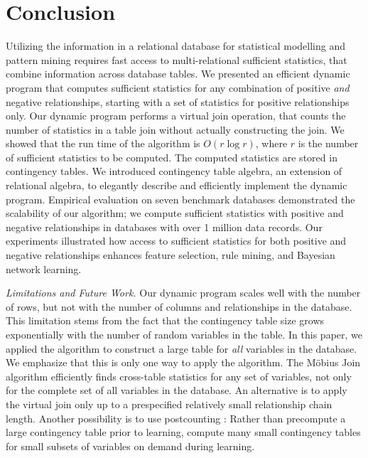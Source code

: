 \documentclass{sig-alternate-2013}
\begin{document}
\section{Conclusion} \label{sec:conclusion} 
Utilizing the information in a relational database for statistical modelling and pattern mining requires fast access to multi-relational sufficient statistics, that combine information across database tables. 
We presented an efficient dynamic program that computes sufficient statistics for any combination of positive {\em and} negative relationships, starting with a set of statistics for positive relationships only.
Our dynamic program performs a virtual join operation, that counts the number of statistics in a table join without actually constructing the join. We showed that the run time of the algorithm is $O(r \log r)$, where $r$ is the number of sufficient statistics to be computed.
The computed statistics are stored in contingency tables.
We introduced contingency table algebra, an extension of relational algebra, to elegantly describe and efficiently implement the dynamic program. 
Empirical evaluation on seven benchmark databases demonstrated the scalability of our algorithm; we compute sufficient statistics with positive and negative relationships in databases with over 1 million data records.  
Our experiments illustrated how access to sufficient statistics for both positive and negative relationships enhances feature selection, rule mining, and Bayesian network learning.  




\emph{Limitations and Future Work.} 
Our dynamic program scales well with the number of rows, but not with the number of columns and relationships in the database. 
This limitation stems from the fact that the contingency table size grows exponentially with the number of random variables in the table. In this paper, we applied the algorithm to construct a large table for {\em all} variables in the database. We emphasize that this is only one way to apply the algorithm. The M\"obius Join algorithm efficiently finds cross-table statistics for any set of variables, not only for the complete set of all variables in the database. An alternative is to apply the virtual join only up to a prespecified relatively small relationship chain length.
Another possibility is to use postcounting \cite{lv2012}: Rather than precompute a large contingency table prior to learning, compute many small contingency tables for  small subsets of variables on demand during learning. 
\end{document}

